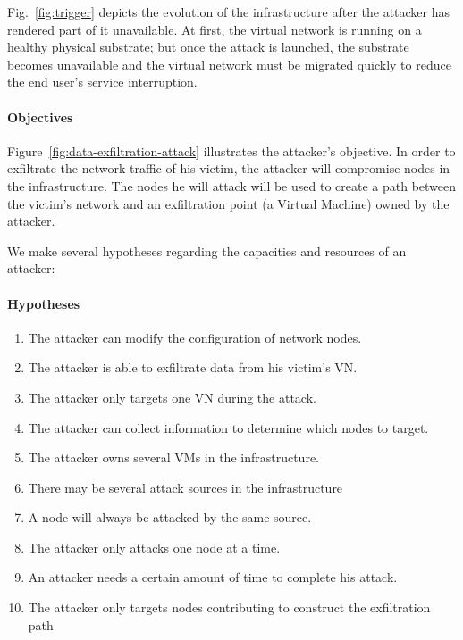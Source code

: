 \label{sec:attack_model}

Fig.~\ref{fig:trigger} depicts the evolution of the infrastructure after the attacker has rendered part of it unavailable. 
At first, the virtual network is running on a healthy physical substrate; but once the attack is launched, the substrate becomes unavailable and the virtual network must be migrated quickly to reduce the end user's service interruption.

\paragraph{Objectives}
Figure~\ref{fig:data-exfiltration-attack} illustrates the attacker's objective.
In order to exfiltrate the network traffic of his victim, the attacker will compromise nodes in the infrastructure. The nodes he will attack will be used to create a path between the victim's network and an exfiltration point (\eg a Virtual Machine) owned by the attacker.

We make several hypotheses regarding the capacities and resources of an attacker:
\paragraph{Hypotheses}
\begin{enumerate}
    \item The attacker can modify the configuration of network nodes.
    \item The attacker is able to exfiltrate data from his victim's VN.
    \item The attacker only targets one VN during the attack.
    \item The attacker can collect information to determine which nodes to target.
    \item The attacker owns several VMs in the infrastructure.
    \item There may be several attack sources in the infrastructure
    \item A node will always be attacked by the same source.
    \item The attacker only attacks one node at a time.
    \item An attacker needs a certain amount of time to complete his attack.
    \item The attacker only targets nodes contributing to construct the exfiltration path
    
\end{enumerate}

